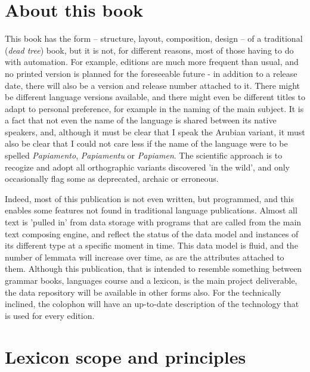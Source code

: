 \chapter{About this book}
This book has the form -- structure, layout, composition, design -- of a traditional (\emph{dead tree}) book, but it is not, for different reasons, most of those having to do with automation. For example, editions are much more frequent than usual, and no printed version is planned for the foreseeable future - in addition to a release date, there will also be a version and release number attached to it. There might be different language versions available, and there might even be different titles to adapt to personal preference, for example in the naming of the main subject.  It is a fact that not even the name of the language is shared between its native speakers, and, although it must be clear that I speak the Arubian variant, it must also be clear that I could not care less if the name of the language were to be spelled \emph{Papiamento}, \emph{Papiamentu} or \emph{Papiamen}. The scientific approach is to recogize and adopt all orthographic variants discovered 'in the wild', and only occasionally flag some as deprecated, archaic or erroneous.

Indeed, most of this publication is not even written, but programmed, and this enables some features not found in traditional language publications. Almost all text is 'pulled in' from data storage with programs that are called from the main text composing engine, and reflect the status of the data model and instances of its different type at a specific moment in time. This data model is fluid, and the number of lemmata will increase over time, as are the attributes attached to them. Although this publication, that is intended to resemble something between grammar books, languages course and a lexicon, is the main project deliverable, the data repository will be available in other forms also. For the technically inclined, the colophon will have an up-to-date description of the technology that is used for every edition.


\chapter{Lexicon scope and principles}
